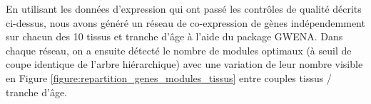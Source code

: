 En utilisant les données d'expression qui ont passé les contrôles de qualité décrits ci-dessus, nous avons généré un réseau de co-expression de gènes indépendemment sur chacun des 10 tissus et tranche d'âge à l'aide du package GWENA. 
Dans chaque réseau, on a ensuite détecté le nombre de modules optimaux (à seuil de coupe identique de l'arbre hiérarchique) avec une variation de leur nombre visible en Figure \ref{figure:repartition_genes_modules_tissus} entre couples tissus / tranche d'âge.

